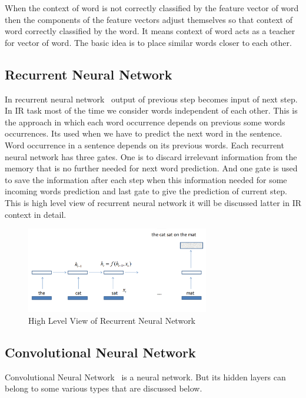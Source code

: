 \documentclass{doublecol-new}
\theoremstyle{TH}{
\newtheorem{lemma}{Lemma}
\newtheorem{theorem}[lemma]{Theorem}
\newtheorem{corrolary}[lemma]{Corrolary}
\newtheorem{conjecture}[lemma]{Conjecture}
\newtheorem{proposition}[lemma]{Proposition}
\newtheorem{claim}[lemma]{Claim}
\newtheorem{stheorem}[lemma]{Wrong Theorem}
\newtheorem{algorithm}{Algorithm}
}
\theoremstyle{THrm}{
\newtheorem{definition}{Definition}[section]
\newtheorem{question}{Question}[section]
\newtheorem{remark}{Remark}
\newtheorem{scheme}{Scheme}
}
\theoremstyle{THhit}{
\newtheorem{case}{Case}[section]
}
\begin{document}
When the context of word is not correctly classified by the feature vector of word then the components of the feature vectors adjust themselves so that context of word correctly classified by the word. It means context of word acts as a teacher for vector of word. The basic idea is to place similar words closer to each other. 



\subsection{Recurrent Neural Network} In recurrent neural network~\cite{7804882} output of previous step becomes input of next step. In IR task most of the time we consider words independent of each other. This is the approach in which each word occurrence depends on previous some words occurrences. Its used when we have to predict the next word in the sentence. Word occurrence in a sentence depends on its previous words. Each recurrent neural network has three gates. One is to discard irrelevant information from the memory that is no further needed for next word prediction. And one gate is used to save the information after each step when this information needed for some incoming words prediction and last gate to give the prediction of current step. This is high level view of recurrent neural network it will be discussed latter in IR context in detail. 

\begin{figure}[h]
	\centerline{\includegraphics[width=8cm,keepaspectratio]{image/rnn.PNG}}
	\label{fig:Recurrent Neural Network}
	\caption{High Level View of Recurrent Neural Network}
\end{figure} 


\subsection{Convolutional Neural Network}

Convolutional Neural Network~\cite{7804882,shen2014latent,severyn2016modeling} is a neural network. But its hidden layers can belong to some various types that are discussed below.
\end{document}
